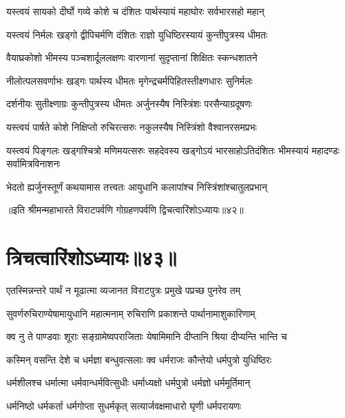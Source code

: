 \twolineshloka
{यस्त्वयं सायको दीर्घो गव्ये कोशे च दंशितः}
{पार्थस्यायं महाघोरः सर्वभारसहो महान्}


\twolineshloka
{यस्त्वयं निर्मलः खड्गो द्वीपिचर्मणि दंशितः}
{राज्ञो युधिष्ठिरस्यायं कुन्तीपुत्रस्य धीमतः}



\twolineshloka
{वैयाघ्रकोशो भीमस्य पञ्चशार्दूललक्षणः}
{वारणानां सुदृप्तानां शिक्षितः स्कन्धशातने}


\twolineshloka
{नीलोत्पलसवर्णाभः खड्गः पार्थस्य धीमतः}
{मृगेन्द्रचर्मपिहितस्तीक्ष्णधारः सुनिर्मलः}


\twolineshloka
{दर्शनीयः सुतीक्ष्णाग्रः कुन्तीपुत्रस्य धीमतः}
{अर्जुनस्यैष निस्त्रिंशः परसैन्याग्रदूषणः}


\twolineshloka
{यस्त्वयं पार्षते कोशे निक्षिप्तो रुचिरत्सरुः}
{नकुलस्यैष निस्त्रिंशो वैश्वानरसमप्रभः}


\threelineshloka
{यस्त्वयं पिङ्गलः खड्गश्चित्रो मणिमयत्सरुः}
{सहदेवस्य खड्गोऽयं भारसाहोऽतिदंशितः}
{भीमस्यायं महादण्डः सर्वामित्रविनाशनः}



\twolineshloka
{भेदतो ह्यर्जुनस्तूर्णं कथयामास तत्त्वतः}
{आयुधानि कलापांश्च निस्त्रिंशांश्चातुलप्रभान्}

॥इति श्रीमन्महाभारते विराटपर्वणि गोग्रहणपर्वणि द्विचत्वारिंशोऽध्यायः॥४२॥

\chapter{त्रिचत्वारिंशोऽध्यायः॥४३॥}

\twolineshloka
{एतस्मिन्नन्तरे पार्थं न मूढात्मा व्यजानत}
{विराटपुत्रः प्रमुखे पप्रच्छ पुनरेव तम्}


\twolineshloka
{सुवर्णरुचिराण्येषामायुधानि महात्मनाम्}
{रुचिराणि प्रकाशन्ते पार्थानामाशुकारिणाम्}


\twolineshloka
{क्व नु ते पाण्डवाः शूराः सङ्ग्रामेष्वपराजिताः}
{येषामिमानि दीप्तानि श्रिया दीप्यन्ति भान्ति च}



\twolineshloka
{कस्मिन् वसन्ति देशे च धर्मज्ञा बन्धुवत्सलाः}
{क्व धर्मराजः कौन्तेयो धर्मपुत्रो युधिष्ठिरः}


\twolineshloka
{धर्मशीलश्च धर्मात्मा धर्मवान्धर्मवित्सुधीः}
{धर्माध्यक्षो धर्मपुत्रो धर्मज्ञो धर्ममूर्तिमान्}


\twolineshloka
{धर्मनिष्ठो धर्मकर्ता धर्मगोप्ता सुधर्मकृत्}
{सत्यार्जवक्षमाधारो घृणी धर्मपरायणः}


